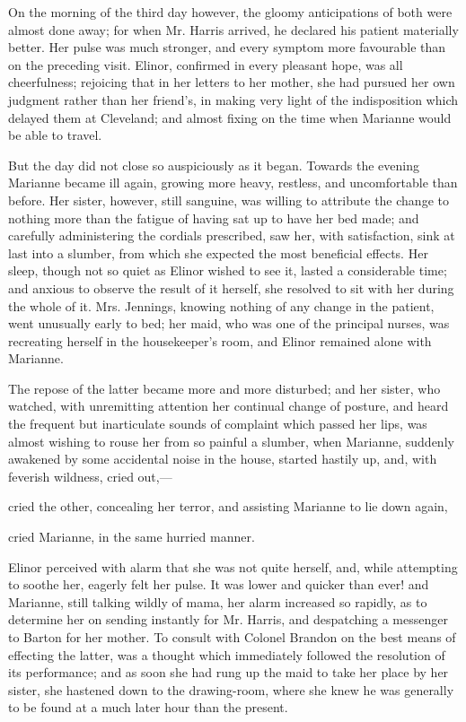 On the morning of the third day however, the gloomy anticipations of both were almost done away; for when Mr. Harris arrived, he declared his patient materially better. Her pulse was much stronger, and every symptom more favourable than on the preceding visit. Elinor, confirmed in every pleasant hope, was all cheerfulness; rejoicing that in her letters to her mother, she had pursued her own judgment rather than her friend's, in making very light of the indisposition which delayed them at Cleveland; and almost fixing on the time when Marianne would be able to travel.

But the day did not close so auspiciously as it began. Towards the evening Marianne became ill again, growing more heavy, restless, and uncomfortable than before. Her sister, however, still sanguine, was willing to attribute the change to nothing more than the fatigue of having sat up to have her bed made; and carefully administering the cordials prescribed, saw her, with satisfaction, sink at last into a slumber, from which she expected the most beneficial effects. Her sleep, though not so quiet as Elinor wished to see it, lasted a considerable time; and anxious to observe the result of it herself, she resolved to sit with her during the whole of it. Mrs. Jennings, knowing nothing of any change in the patient, went unusually early to bed; her maid, who was one of the principal nurses, was recreating herself in the housekeeper's room, and Elinor remained alone with Marianne.

The repose of the latter became more and more disturbed; and her sister, who watched, with unremitting attention her continual change of posture, and heard the frequent but inarticulate sounds of complaint which passed her lips, was almost wishing to rouse her from so painful a slumber, when Marianne, suddenly awakened by some accidental noise in the house, started hastily up, and, with feverish wildness, cried out,---


 cried the other, concealing her terror, and assisting Marianne to lie down again, 

 cried Marianne, in the same hurried manner. 

Elinor perceived with alarm that she was not quite herself, and, while attempting to soothe her, eagerly felt her pulse. It was lower and quicker than ever! and Marianne, still talking wildly of mama, her alarm increased so rapidly, as to determine her on sending instantly for Mr. Harris, and despatching a messenger to Barton for her mother. To consult with Colonel Brandon on the best means of effecting the latter, was a thought which immediately followed the resolution of its performance; and as soon she had rung up the maid to take her place by her sister, she hastened down to the drawing-room, where she knew he was generally to be found at a much later hour than the present.

